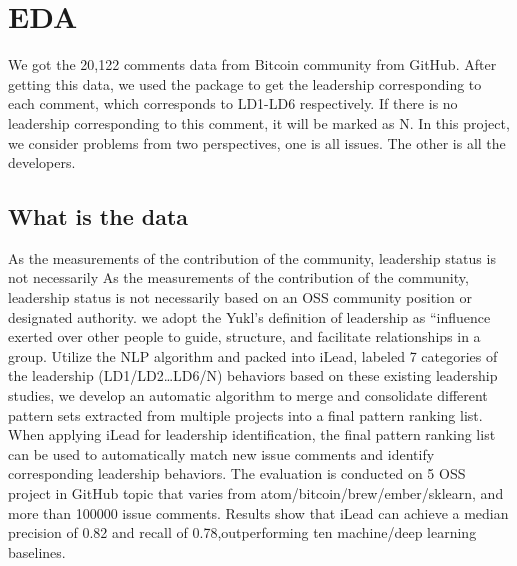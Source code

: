 \section{EDA}
We got the 20,122 comments data from Bitcoin community from GitHub. After getting this data, we used the package to get the leadership corresponding to each comment, which corresponds to LD1-LD6 respectively.\citeyear{huang2022identifying} If there is no leadership corresponding to this comment, it will be marked as N. In this project, we consider problems from two perspectives, one is all issues. The other is all the developers.\cite{bass1996multifactor}
\subsection{What is the data}
As the measurements of the contribution of the community, leadership status is not necessarily As the measurements of the contribution of the community, leadership status is not necessarily based on an OSS community position or designated authority. we adopt the Yukl's definition of leadership\cite{yukl1992theory} as “influence exerted over other people to guide, structure, and facilitate relationships in a group. Utilize the NLP algorithm and packed into iLead, labeled 7 categories of the leadership (LD1/LD2…LD6/N)\cite{zhu2012effectiveness,huang2022identifying} behaviors based on these existing leadership studies, we develop an automatic algorithm to merge and consolidate different pattern sets extracted from multiple projects into a final pattern ranking list. When applying iLead for leadership identification, the final pattern ranking list can be used to automatically match new issue comments and identify corresponding leadership behaviors. The evaluation is conducted on 5 OSS project in GitHub topic that varies from atom/bitcoin/brew/ember/sklearn, and more than 100000 issue comments. Results show that iLead can achieve a median precision of 0.82 and recall of 0.78,outperforming ten machine/deep learning baselines.\cite{pustejovsky2012natural}
